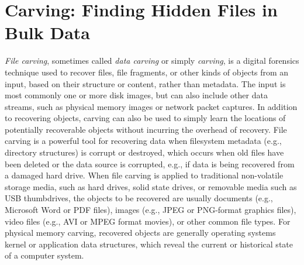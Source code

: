 \chapter{Carving: Finding Hidden Files in Bulk Data}

\emph{File carving}, sometimes called \emph{data carving} or simply \emph{carving}, is a digital forensics technique used to recover files, file fragments, or other kinds of objects from an input, based on their structure or content, rather than metadata.  The input is most commonly one or more disk images, but can also include other data streams, such as physical memory images or network packet captures. In addition to recovering objects, carving can also be used to simply learn the locations of potentially recoverable objects without incurring the overhead of recovery.  File carving is a powerful tool for recovering data when filesystem metadata (e.g., directory structures) is corrupt or destroyed, which occurs when old files have been deleted or the data source is corrupted, e.g., if data is being recovered from a damaged hard drive.  When file carving is applied to traditional non-volatile storage media, such as hard drives, solid state drives, or removable media such as USB thumbdrives, the objects to be recovered are usually documents (e.g., Microsoft Word or PDF files), images (e.g., JPEG or PNG-format graphics files), video files (e.g., AVI or MPEG format movies), or other common file types.  For physical memory carving, recovered objects are generally operating systems kernel or application data structures, which reveal the current or historical state of a computer system.  


